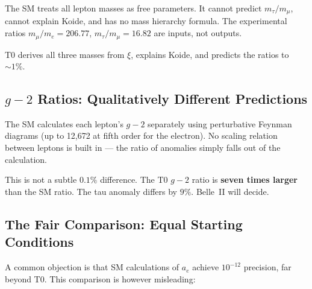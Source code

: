 The SM treats all lepton masses as free parameters. It cannot predict $m_\tau/m_\mu$, cannot explain Koide, and has no mass hierarchy formula. The experimental ratios $m_\mu/m_e = 206.77$, $m_\tau/m_\mu = 16.82$ are inputs, not outputs.

T0 derives all three masses from $\xi$, explains Koide, and predicts the ratios to $\sim 1\%$.

\subsection{$g-2$ Ratios: Qualitatively Different Predictions}

The SM calculates each lepton's $g-2$ separately using perturbative Feynman diagrams (up to 12,672 at fifth order for the electron). No scaling relation between leptons is built in --- the ratio of anomalies simply falls out of the calculation.

\begin{table}[h]
	\centering
	\caption{T0 vs SM: $g-2$ ratio predictions for the tau lepton}
	\label{tab:g2comparison}
\end{table}

This is not a subtle $0.1\%$ difference. The T0 $g-2$ ratio is \textbf{seven times larger} than the SM ratio. The tau anomaly differs by $9\%$. Belle~II will decide.

\subsection{The Fair Comparison: Equal Starting Conditions}

A common objection is that SM calculations of $a_e$ achieve $10^{-12}$ precision, far beyond T0. This comparison is however misleading:

